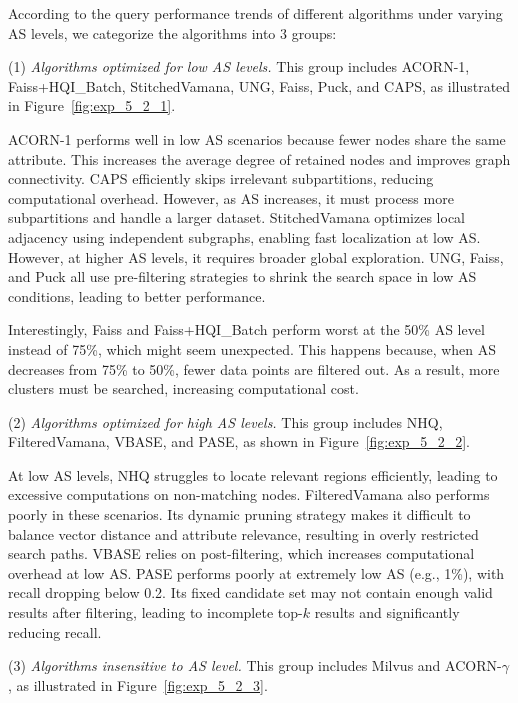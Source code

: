 \documentclass[sigconf, nonacm]{acmart}
\begin{document}
According to the query performance trends of different algorithms under varying AS levels, we categorize the algorithms into 3 groups:

(1) \textit{Algorithms optimized for low AS levels.}  
This group includes ACORN-1, Faiss+HQI\_Batch, StitchedVamana, UNG, Faiss, Puck, and CAPS, as illustrated in Figure~\ref{fig:exp_5_2_1}.

ACORN-1 performs well in low AS scenarios because fewer nodes share the same attribute. This increases the average degree of retained nodes and improves graph connectivity. CAPS efficiently skips irrelevant subpartitions, reducing computational overhead. However, as AS increases, it must process more subpartitions and handle a larger dataset. StitchedVamana optimizes local adjacency using independent subgraphs, enabling fast localization at low AS. However, at higher AS levels, it requires broader global exploration. UNG, Faiss, and Puck all use pre-filtering strategies to shrink the search space in low AS conditions, leading to better performance.

Interestingly, Faiss and Faiss+HQI\_Batch perform worst at the 50\% AS level instead of 75\%, which might seem unexpected. This happens because, when AS decreases from 75\% to 50\%, fewer data points are filtered out. As a result, more clusters must be searched, increasing computational cost.

\par
(2) \textit{Algorithms optimized for high AS levels.}  
This group includes NHQ, FilteredVamana, VBASE, and PASE, as shown in Figure~\ref{fig:exp_5_2_2}.

At low AS levels, NHQ struggles to locate relevant regions efficiently, leading to excessive computations on non-matching nodes. FilteredVamana also performs poorly in these scenarios. Its dynamic pruning strategy makes it difficult to balance vector distance and attribute relevance, resulting in overly restricted search paths.
VBASE relies on post-filtering, which increases computational overhead at low AS. PASE performs poorly at extremely low AS (e.g., 1\%), with recall dropping below 0.2. Its fixed candidate set may not contain enough valid results after filtering, leading to incomplete top-$k$ results and significantly reducing recall.

\par
(3) \textit{Algorithms insensitive to AS level.}  
This group includes Milvus and ACORN-\(\gamma\), as illustrated in Figure~\ref{fig:exp_5_2_3}.
\end{document}

